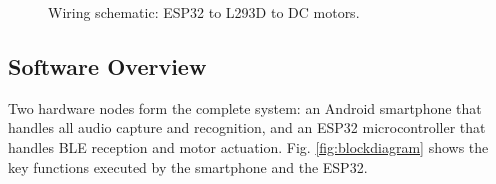 \documentclass[conference]{IEEEtran}
\begin{document}
\begin{figure}[H]
{
		}
		\caption{Wiring schematic: ESP32 to L293D to DC motors.
		}
		\label{fig:wiring}
	\end{figure}
	
	
	
	
	\subsection{Software Overview}
	Two hardware nodes form the complete system: an Android smartphone
	that handles all audio capture and recognition, and an ESP32
	microcontroller that handles BLE reception and motor actuation.
	Fig. \ref{fig:blockdiagram} shows the key functions executed by the smartphone and the ESP32.

	
\end{document}
